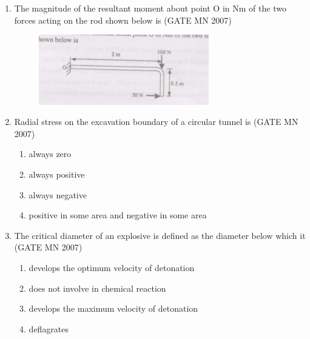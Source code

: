 \documentclass[journal]{IEEEtran}
\begin{document}
\begin{enumerate}
    \item The magnitude of the resultant moment about point O in Nm of the two forces acting on the rod shown below is
	    \hfill (GATE MN 2007)
    \begin{figure}[H]
    \centering
        \includegraphics[width=0.7\textwidth]{Screenshot_2025_0812_111906.png}
	    \caption{}
    \label{fig:Q4}
    \end{figure}
    \begin{enumerate}
	\begin{multicols}{4}	    
        \item 25 
        \item 125 
        \item 175 
        \item 225 
	\end{multicols}	
    \end{enumerate}


    \item Radial stress on the excavation boundary of a circular tunnel is
	    \hfill (GATE MN 2007)
    \begin{enumerate}
		    
        \item always zero
        \item always positive
        \item always negative
        \item positive in some area and negative in some area
		
    \end{enumerate}


    \item The critical diameter of an explosive is defined as the diameter below which it
	    \hfill (GATE MN 2007)
    \begin{enumerate}
        \item develops the optimum velocity of detonation
        \item does not involve in chemical reaction
        \item develops the maximum velocity of detonation
        \item deflagrates
		

\end{enumerate}
\end{enumerate}
\end{document}
